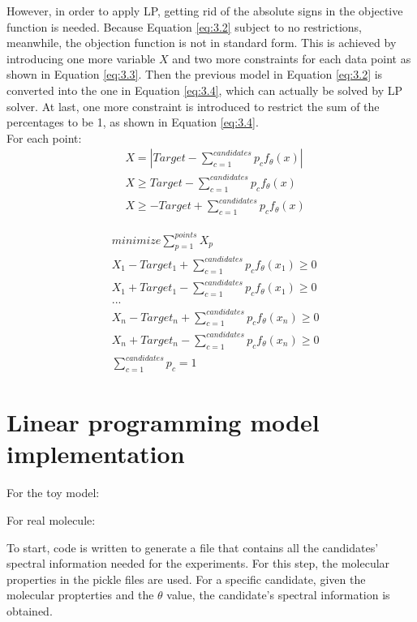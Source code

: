 However, in order to apply LP, getting rid of the absolute signs in the objective function is needed. Because Equation \ref{eq:3.2} subject to no restrictions, meanwhile, the objection function is not in standard form. This is achieved by introducing one more variable $X$ and two more constraints for each data point as shown in Equation \ref{eq:3.3}. Then the previous model in Equation \ref{eq:3.2} is converted into the one in Equation \ref{eq:3.4}, which can actually be solved by LP solver. At last, one more constraint is introduced to restrict the sum of the percentages to be 1, as shown in Equation \ref{eq:3.4}. \\

For each point:
\begin{eqnarray} \label{eq:3.3}
& X = \left| Target-\displaystyle\sum^{candidates}_{c=1}p_{c}f_{\theta}(x) \right| \nonumber \\
&  X \geq Target-\displaystyle\sum^{candidates}_{c=1}p_{c}f_{\theta}(x)   \nonumber \\
& X \geq -Target+\displaystyle\sum^{candidates}_{c=1}p_{c}f_{\theta}(x)  
\end{eqnarray} 

\begin{eqnarray} \label{eq:3.4}
& minimize \displaystyle\sum^{points}_{p=1} X_p \nonumber \\
& X_1 - Target_1 + \displaystyle\sum^{candidates}_{c=1}p_{c}f_{\theta}(x_1) \geq 0 \nonumber \\
& X_1 + Target_1 - \displaystyle\sum^{candidates}_{c=1}p_{c}f_{\theta}(x_1) \geq 0 \nonumber \\
& ... \nonumber \\
& X_n - Target_n + \displaystyle\sum^{candidates}_{c=1}p_{c}f_{\theta}(x_n) \geq 0 \nonumber \\
& X_n + Target_n - \displaystyle\sum^{candidates}_{c=1}p_{c}f_{\theta}(x_n) \geq 0 \nonumber \\
& \displaystyle\sum^{candidates}_{c=1}p_{c} = 1 
\end{eqnarray} 

\section{Linear programming model implementation}
For the toy model:


For real molecule:


To start, code is written to generate a file that contains all the candidates' spectral information needed for the experiments. For this step, the molecular properties in the pickle files are used. For a specific candidate, given the molecular propterties and the $\theta$ value, the candidate's spectral information is obtained. \\

